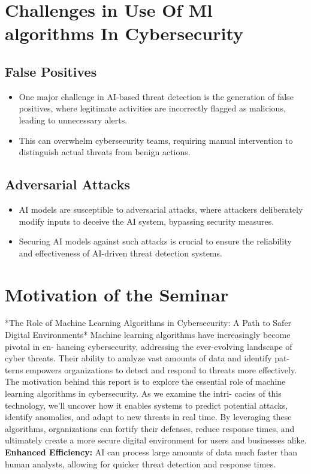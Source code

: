 \documentclass[oneside,a4paper,12pt]{report}
\begin{document}
\section{Challenges in Use Of Ml algorithms In Cybersecurity}

\subsection{False Positives}
\begin{itemize}
\item 
One major challenge in AI-based threat detection is the generation of false positives, where legitimate activities are incorrectly flagged as malicious, leading to unnecessary alerts.
\newline \item 
This can overwhelm cybersecurity teams, requiring manual intervention to distinguish actual threats from benign actions.
\end{itemize}

\subsection{Adversarial Attacks}
\begin{itemize}
\item 
AI models are susceptible to adversarial attacks, where attackers deliberately modify inputs to deceive the AI system, bypassing security measures.
\newline \item 
Securing AI models against such attacks is crucial to ensure the reliability and effectiveness of AI-driven threat detection systems.
\end{itemize}

\vspace*{2\baselineskip}
\section{Motivation of the Seminar}
\justifying
\noindent
 *The Role of Machine Learning Algorithms in Cybersecurity: A Path
to Safer Digital Environments*
Machine learning algorithms have increasingly become pivotal in en-
hancing cybersecurity, addressing the ever-evolving landscape of cyber
threats. Their ability to analyze vast amounts of data and identify pat-
terns empowers organizations to detect and respond to threats more
effectively.
\newline
The motivation behind this report is to explore the essential role of
machine learning algorithms in cybersecurity. As we examine the intri-
cacies of this technology, we’ll uncover how it enables systems to predict
potential attacks, identify anomalies, and adapt to new threats in real
time. By leveraging these algorithms, organizations can fortify their
defenses, reduce response times, and ultimately create a more secure
digital environment for users and businesses alike.
\vspace*{1\baselineskip}
\newline\textbf{Enhanced Efficiency:} AI can process large amounts of data much faster than human analysts, allowing for quicker threat detection and response times.
\vspace*{1\baselineskip}
\end{document}
